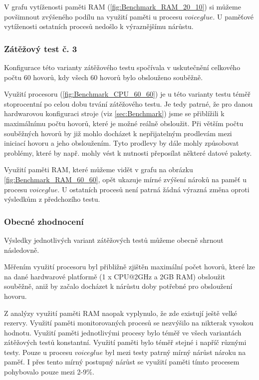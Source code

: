 \documentclass[ing,male,java,dept460]{diploma}						%
\begin{document}
V grafu vytíženosti paměti RAM (\ref{fig:Benchmark_RAM_20_10}) si můžeme povšimnout zvýšeného podílu na využití paměti u procesu $voiceglue$. U paměťové vytíženosti ostatních procesů nedošlo k výraznějšímu nárůstu.

\subsubsection{Zátěžový test č. 3}
Konfigurace této varianty zátěžového testu spočívala v uskutečnění celkového počtu 60 hovorů, kdy všech 60 hovorů bylo obslouženo souběžně.

Využití procesoru (\ref{fig:Benchmark_CPU_60_60}) je u této varianty testu téměř stoprocentní po celou dobu trvání zátěžového testu. Je tedy patrné, že pro danou hardwarovou konfiguraci stroje (viz \ref{sec:Benchmark}) jsme se přiblížili k maximálnímu počtu hovorů, které je možné reálně obsloužit. Při větším počtu souběžných hovorů by již mohlo docházet k nepřijatelným prodlevám mezi iniciací hovoru a jeho obsloužením. Tyto prodlevy by dále mohly způsobovat problémy, které by např. mohly vést k nutnosti přeposílat některé datové pakety.

Využití paměti RAM, které můžeme vidět v grafu na obrázku \ref{fig:Benchmark_RAM_60_60}, opět ukazuje mírné zvýšení nároků na paměť u procesu $voiceglue$. U ostatních procesů není patrná žádná výrazná změna oproti výsledkům z předchozího testu.


\subsubsection{Obecné zhodnocení}
Výsledky jednotlivých variant zátěžových testů můžeme obecně shrnout následovně.

Měřením využití procesoru byl přibližně zjištěn maximální počet hovorů, které lze na dané hardwarové platformě (1 x CPU@2GHz a 2GB RAM) obsloužit souběžně, aniž by začalo docházet k nárůstu doby potřebné pro obsloužení hovoru.

Z analýzy využití paměti RAM naopak vyplynulo, že zde existují ještě velké rezervy. Využití paměti monitorovaných procesů se nezvýšilo na nikterak vysokou hodnotu. Využití paměti jednotlivými procesy bylo téměř ve všech variantách zátěžových testů konstantní. Využití paměti bylo téměř stejné i napříč různými testy. Pouze u procesu $voiceglue$ byl mezi testy patrný mírný nárůst nároku na paměť. I přes tento mírný postupný nárůst se využití paměti tímto procesem pohybovalo pouze mezi 2-9\%.
\end{document}
